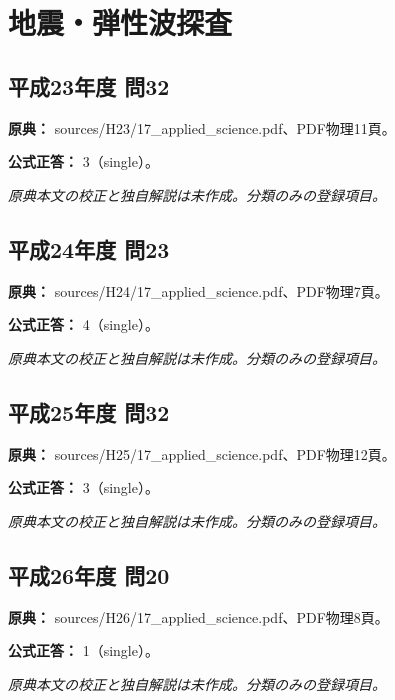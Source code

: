 \section{地震・弾性波探査}

\subsection{平成23年度 問32}
\label{q:h23-reg-applied-32}

\noindent\textbf{原典：} sources/H23/17\_applied\_science.pdf、PDF物理11頁。

\textbf{公式正答：} 3（single）。

\par\textit{原典本文の校正と独自解説は未作成。分類のみの登録項目。}

\subsection{平成24年度 問23}
\label{q:h24-reg-applied-23}

\noindent\textbf{原典：} sources/H24/17\_applied\_science.pdf、PDF物理7頁。

\textbf{公式正答：} 4（single）。

\par\textit{原典本文の校正と独自解説は未作成。分類のみの登録項目。}

\subsection{平成25年度 問32}
\label{q:h25-reg-applied-32}

\noindent\textbf{原典：} sources/H25/17\_applied\_science.pdf、PDF物理12頁。

\textbf{公式正答：} 3（single）。

\par\textit{原典本文の校正と独自解説は未作成。分類のみの登録項目。}

\subsection{平成26年度 問20}
\label{q:h26-reg-applied-20}

\noindent\textbf{原典：} sources/H26/17\_applied\_science.pdf、PDF物理8頁。

\textbf{公式正答：} 1（single）。

\par\textit{原典本文の校正と独自解説は未作成。分類のみの登録項目。}

